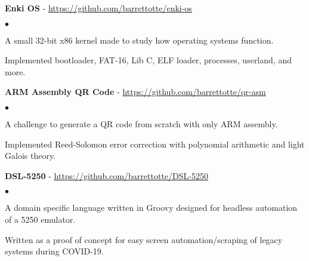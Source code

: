 \documentclass[a4paper]{article}
\newcommand{\project}[3]{
    \textbf{#1} - \href{#2}{#2}\hfill\textbf{#3}
}
\newenvironment{resumelist}{
    \vspace*{4pt}
    \begin{list}
        {\small$\bullet$}{\topsep 0pt \itemsep -2pt \leftmargin=22pt}}{\vspace*{4pt}
    \end{list}
}
\begin{document}
        \project{Enki OS}{https://github.com/barrettotte/enki-os}{}
            \begin{resumelist}
                \item A small 32-bit x86 kernel made to study how operating systems function.
                \item Implemented bootloader, FAT-16, Lib C, ELF loader, processes, userland, and more.
            \end{resumelist}
        \vspace*{6pt}

        \project{ARM Assembly QR Code}{https://github.com/barrettotte/qr-asm}{}
            \begin{resumelist}
                \item A challenge to generate a QR code from scratch with only ARM assembly.
                \item Implemented Reed-Solomon error correction with polynomial arithmetic and light Galois theory.
            \end{resumelist}
        \vspace*{6pt}

        \project{DSL-5250}{https://github.com/barrettotte/DSL-5250}{}
            \begin{resumelist}
                \item A domain specific language written in Groovy designed for headless automation of a 5250 emulator.
                \item Written as a proof of concept for easy screen automation/scraping of legacy systems during COVID-19.
            \end{resumelist}
        \vspace*{6pt}
\end{document}
